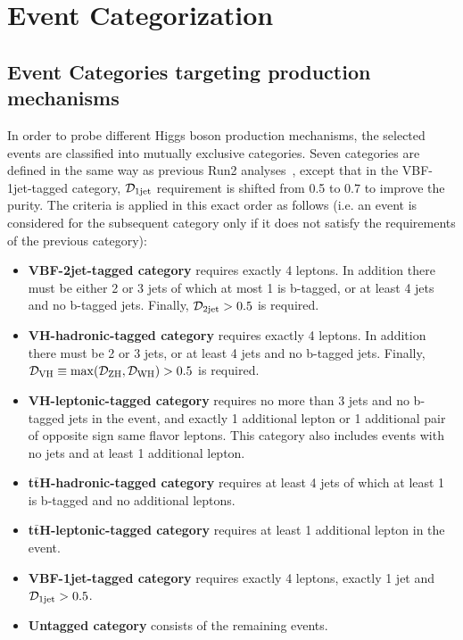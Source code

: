 \section{Event Categorization}
\label{sec:categorization}

\subsection{Event Categories targeting production mechanisms}

In order to probe different Higgs boson production mechanisms, the selected events are classified into mutually exclusive categories. Seven categories are defined in the same way as previous Run2 analyses~\cite{CMS-PAS-HIG-18-001}, except that in the VBF-1jet-tagged category, ${\cal D}_{\rm 1jet}$ requirement is shifted from 0.5 to 0.7 to improve the purity. The criteria is applied in this exact order as follows (i.e. an event is considered for the subsequent category only if it does not satisfy the requirements of the previous category):

\begin{itemize}
\item {\bf VBF-2jet-tagged category} requires exactly 4 leptons. In addition there must be either 2 or 3 jets of which at most 1 is b-tagged, or at least 4 jets and no b-tagged jets. Finally, ${\cal D}_{\rm 2jet}>0.5$ is required.
\item {\bf VH-hadronic-tagged category} requires exactly 4 leptons. In addition there must be 2 or 3 jets, or at least 4 jets and no b-tagged jets. Finally, ${\cal D}_{\rm VH} \equiv {\rm max}({\cal D}_{\rm ZH},{\cal D}_{\rm WH})>0.5$ is required.
\item {\bf VH-leptonic-tagged category} requires no more than 3 jets and no b-tagged jets in the event,
and exactly 1 additional lepton or 1 additional pair of opposite sign same flavor leptons. This category also includes events
with no jets and at least 1 additional lepton.
\item {\bf t$\mathbf{\bar{t}}$H-hadronic-tagged category} requires at least 4 jets of which at least 1 is b-tagged and no additional leptons.
\item {\bf t$\mathbf{\bar{t}}$H-leptonic-tagged category} requires at least 1 additional lepton in the event.
\item {\bf VBF-1jet-tagged category} requires exactly 4 leptons, exactly 1 jet and ${\cal D}_{\rm 1jet}>0.5$.
\item {\bf Untagged category} consists of the remaining events.
\end{itemize}

